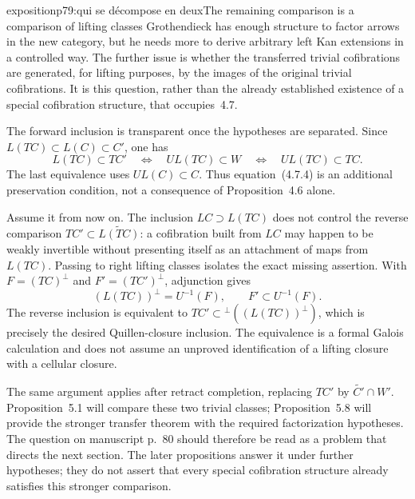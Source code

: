 \begin{dcomment}{exposition}{p79:qui se décompose en deux}{The remaining comparison is a comparison of lifting classes}
Grothendieck has enough structure to factor arrows in the new category, but he needs more to derive arbitrary left Kan extensions in a controlled way. The further issue is whether the transferred trivial cofibrations are generated, for lifting purposes, by the images of the original trivial cofibrations. It is this question, rather than the already established existence of a special cofibration structure, that occupies~4.7.

The forward inclusion is transparent once the hypotheses are separated. Since $L(TC)\subset L(C)\subset C'$, one has
\[
 L(TC)\subset TC'
 \quad\Longleftrightarrow\quad UL(TC)\subset W
 \quad\Longleftrightarrow\quad UL(TC)\subset TC.
\]
The last equivalence uses $UL(C)\subset C$. Thus equation~(4.7.4) is an additional preservation condition, not a consequence of Proposition~4.6 alone.

Assume it from now on. The inclusion $LC\supset L(TC)$ does not control the reverse comparison $TC'\subset\widetilde{L(TC)}$: a cofibration built from $LC$ may happen to be weakly invertible without presenting itself as an attachment of maps from $L(TC)$. Passing to right lifting classes isolates the exact missing assertion. With $F=(TC)^{\perp}$ and $F'=(TC')^{\perp}$, adjunction gives
\[
 (L(TC))^{\perp}=U^{-1}(F),\qquad
 F'\subset U^{-1}(F).
\]
The reverse inclusion is equivalent to $TC'\subset{}^{\perp}((L(TC))^{\perp})$, which is precisely the desired Quillen-closure inclusion. The equivalence is a formal Galois calculation and does not assume an unproved identification of a lifting closure with a cellular closure.

The same argument applies after retract completion, replacing $TC'$ by $\widetilde{C'}\cap W'$. Proposition~5.1 will compare these two trivial classes; Proposition~5.8 will provide the stronger transfer theorem with the required factorization hypotheses. The question on manuscript p.~80 should therefore be read as a problem that directs the next section. The later propositions answer it under further hypotheses; they do not assert that every special cofibration structure already satisfies this stronger comparison.
\end{dcomment}



